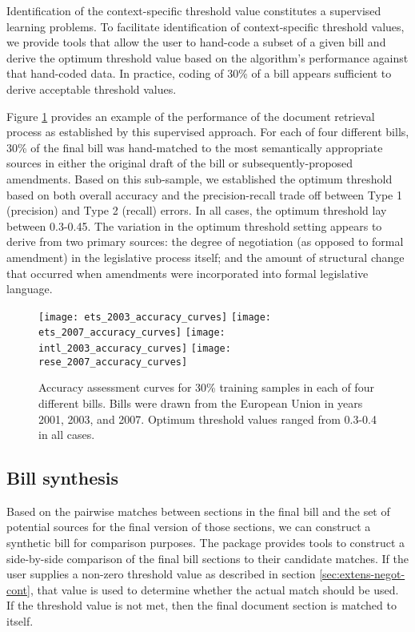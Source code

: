 \documentclass[11pt]{article}
\begin{document}
Identification of the context-specific threshold value constitutes a
supervised learning problems. To facilitate identification of
context-specific threshold values, we provide tools that allow the
user to hand-code a subset of a given bill and derive the optimum
threshold value based on the algorithm's performance against that
hand-coded data. In practice, coding of 30\% of a bill appears
sufficient to derive acceptable threshold values.

Figure \ref{fig:bill-accuracy-curves} provides an example of the
performance of the document retrieval process as established by this
supervised approach. For each of four different bills, 30\% of
the final bill was hand-matched to the most semantically appropriate
sources in either the original draft of the bill or
subsequently-proposed amendments. Based on this sub-sample, we
established the optimum threshold based on both overall accuracy and
the precision-recall trade off between Type 1 (precision) and Type 2
(recall) errors. In all cases, the optimum threshold lay between
0.3-0.45. The variation in the optimum threshold setting appears to
derive from two primary sources: the degree of negotiation (as opposed
to formal amendment) in the legislative process itself; and the amount
of structural change that occurred when amendments were incorporated
into formal legislative language.

\begin{figure}[ht]
  \centering
  \texttt{[image: ets\_2003\_accuracy\_curves]}
  \texttt{[image: ets\_2007\_accuracy\_curves]}
  \texttt{[image: intl\_2003\_accuracy\_curves]}
  \texttt{[image: rese\_2007\_accuracy\_curves]}
  \caption{Accuracy assessment curves for 30\% training samples in
    each of four different bills. Bills were drawn from the European
    Union in years 2001, 2003, and 2007. Optimum threshold values
    ranged from 0.3-0.4 in all cases.}
  \label{fig:bill-accuracy-curves}
\end{figure}

\subsection{Bill synthesis}
\label{sec:bill-synthesis}

Based on the pairwise matches between sections in the final bill and
the set of potential sources for the final version of those sections,
we can construct a synthetic bill for comparison purposes. The package
provides tools to construct a side-by-side comparison of the final
bill sections to their candidate matches. If the user supplies a
non-zero threshold value as described in section
\ref{sec:extens-negot-cont}, that
value is used to determine whether the actual match
should be used. If the threshold value is not met, then the final
document section is matched to itself. 
\end{document}
